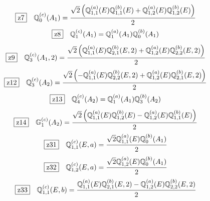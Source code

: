 \documentclass[fleqn,10pt,landscape]{jsarticle}
\begin{document}
\begin{dmath*}
\hspace*{3mm}\fbox{z7}\quad \mathbb{Q}_{0}^{(c)}(A_{1})=\frac{\sqrt{2} \left(\mathbb{Q}_{1,1}^{(a)}(E) \mathbb{Q}_{1,1}^{(b)}(E) + \mathbb{Q}_{1,2}^{(a)}(E) \mathbb{Q}_{1,2}^{(b)}(E)\right)}{2}
\end{dmath*}
\begin{dmath*}
\hspace*{3mm}\fbox{z8}\quad \mathbb{Q}_{1}^{(c)}(A_{1})=\mathbb{Q}_{1}^{(a)}(A_{1}) \mathbb{Q}_{0}^{(b)}(A_{1})
\end{dmath*}
\begin{dmath*}
\hspace*{3mm}\fbox{z9}\quad \mathbb{Q}_{3}^{(c)}(A_{1},2)=\frac{\sqrt{2} \left(\mathbb{Q}_{1,1}^{(a)}(E) \mathbb{Q}_{2,1}^{(b)}(E,2) + \mathbb{Q}_{1,2}^{(a)}(E) \mathbb{Q}_{2,2}^{(b)}(E,2)\right)}{2}
\end{dmath*}
\begin{dmath*}
\hspace*{3mm}\fbox{z12}\quad \mathbb{Q}_{3}^{(c)}(A_{2})=\frac{\sqrt{2} \left(- \mathbb{Q}_{1,1}^{(a)}(E) \mathbb{Q}_{2,2}^{(b)}(E,2) + \mathbb{Q}_{1,2}^{(a)}(E) \mathbb{Q}_{2,1}^{(b)}(E,2)\right)}{2}
\end{dmath*}
\begin{dmath*}
\hspace*{3mm}\fbox{z13}\quad \mathbb{Q}_{4}^{(c)}(A_{2})=\mathbb{Q}_{1}^{(a)}(A_{1}) \mathbb{Q}_{3}^{(b)}(A_{2})
\end{dmath*}
\begin{dmath*}
\hspace*{3mm}\fbox{z14}\quad \mathbb{G}_{1}^{(c)}(A_{2})=\frac{\sqrt{2} \left(\mathbb{Q}_{1,1}^{(a)}(E) \mathbb{Q}_{1,2}^{(b)}(E) - \mathbb{Q}_{1,2}^{(a)}(E) \mathbb{Q}_{1,1}^{(b)}(E)\right)}{2}
\end{dmath*}
\begin{dmath*}
\hspace*{3mm}\fbox{z31}\quad \mathbb{Q}_{1,1}^{(c)}(E,a)=\frac{\sqrt{2} \mathbb{Q}_{1,1}^{(a)}(E) \mathbb{Q}_{0}^{(b)}(A_{1})}{2}
\end{dmath*}
\begin{dmath*}
\hspace*{3mm}\fbox{z32}\quad \mathbb{Q}_{1,2}^{(c)}(E,a)=\frac{\sqrt{2} \mathbb{Q}_{1,2}^{(a)}(E) \mathbb{Q}_{0}^{(b)}(A_{1})}{2}
\end{dmath*}
\begin{dmath*}
\hspace*{3mm}\fbox{z33}\quad \mathbb{Q}_{1,1}^{(c)}(E,b)=\frac{\mathbb{Q}_{1,1}^{(a)}(E) \mathbb{Q}_{2,1}^{(b)}(E,2) - \mathbb{Q}_{1,2}^{(a)}(E) \mathbb{Q}_{2,2}^{(b)}(E,2)}{2}
\end{dmath*}
\end{document}
